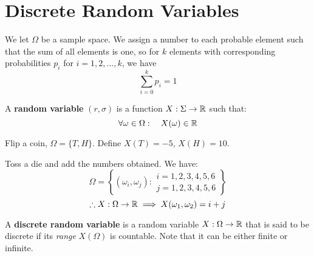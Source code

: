 \documentclass{article}
\begin{document}
\section{Discrete Random Variables}
	We let $\Omega$ be a sample space. We assign a number to each probable element such that the sum of all elements is one, so for $k$ elements with corresponding probabilities $p_i$ for $i=1,2,\dots, k$, we have 
	$$ \sum_{i = 0}^k p_i = 1$$
	\begin{defn}
		A \textbf{random variable} $(r, \sigma)$ is a function $X: \Sigma \to \mathbb{R}$ such that:
		$$ \forall \omega \in \Omega: \quad X(\omega) \in \mathbb{R}$$
	\end{defn}	
	\begin{exmp}
		Flip a coin, $\Omega = \{ T, H\}$. Define $X(T) = -5$, $X(H)=10$. 
	\end{exmp}
	\begin{exmp}
		Toss a die and add the numbers obtained. We have:
		$$ \Omega = \left\{ (\omega_i, \omega_j):  
		\begin{array}{c}
			i = 1,2,3,4,5,6\\
			j=1,2,3,4,5,6
		\end{array}
		\right\}$$
		$$ \therefore X: \Omega \to \mathbb{R} \implies X(\omega_1, \omega_2) = i +j$$
	\end{exmp}
	\begin{defn}
		A \textbf{discrete random variable} is a random variable $X: \Omega \to \mathbb{R}$ that is said to be discrete if its \emph{range} $X(\Omega)$ is countable. Note that it can be either finite or infinite.
		\begin{figure}[h]
		\end{figure}
	\end{defn}
\end{document}
